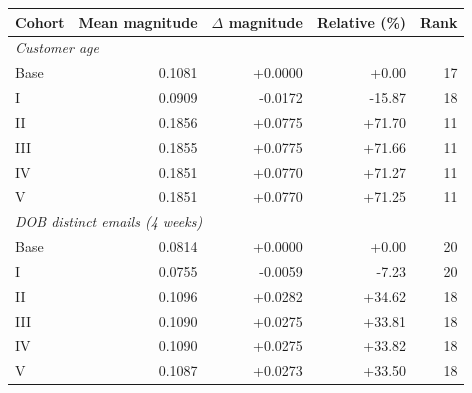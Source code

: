 \begin{tabular}{@{}lrrrr@{}}
\toprule
Cohort & Mean magnitude & $\Delta$ magnitude & Relative (\%) & Rank \\
\midrule
\multicolumn{5}{l}{\textit{Customer age}} \\
Base & 0.1081 & +0.0000 & +0.00 & 17 \\
I & 0.0909 & -0.0172 & -15.87 & 18 \\
II & 0.1856 & +0.0775 & +71.70 & 11 \\
III & 0.1855 & +0.0775 & +71.66 & 11 \\
IV & 0.1851 & +0.0770 & +71.27 & 11 \\
V & 0.1851 & +0.0770 & +71.25 & 11 \\
\multicolumn{5}{l}{\textit{DOB distinct emails (4 weeks)}} \\
Base & 0.0814 & +0.0000 & +0.00 & 20 \\
I & 0.0755 & -0.0059 & -7.23 & 20 \\
II & 0.1096 & +0.0282 & +34.62 & 18 \\
III & 0.1090 & +0.0275 & +33.81 & 18 \\
IV & 0.1090 & +0.0275 & +33.82 & 18 \\
V & 0.1087 & +0.0273 & +33.50 & 18 \\
\bottomrule
\end{tabular}
